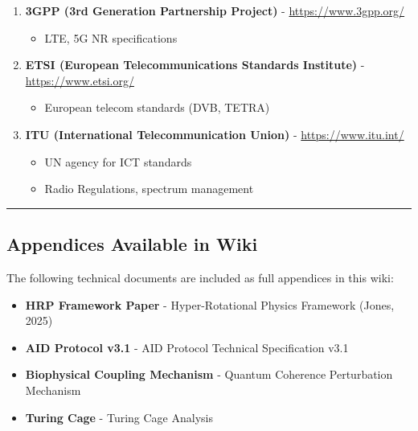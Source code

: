 \begin{enumerate}
\def\labelenumi{\arabic{enumi}.}
\setcounter{enumi}{63}
\tightlist
\item
  \textbf{3GPP (3rd Generation Partnership Project)} - \url{https://www.3gpp.org/}

  \begin{itemize}
  \tightlist
  \item
    LTE, 5G NR specifications
  \end{itemize}
\item
  \textbf{ETSI (European Telecommunications Standards Institute)} - \url{https://www.etsi.org/}

  \begin{itemize}
  \tightlist
  \item
    European telecom standards (DVB, TETRA)
  \end{itemize}
\item
  \textbf{ITU (International Telecommunication Union)} - \url{https://www.itu.int/}

  \begin{itemize}
  \tightlist
  \item
    UN agency for ICT standards
  \item
    Radio Regulations, spectrum management
  \end{itemize}
\end{enumerate}

\begin{center}\rule{0.5\linewidth}{0.5pt}\end{center}

\subsection{\texorpdfstring{Appendices Available in Wiki}{Appendices Available in Wiki}}\label{appendices-available-in-wiki}

The following technical documents are included as full appendices in
this wiki:

\begin{itemize}
\tightlist
\item
  \textbf{HRP Framework Paper} - Hyper-Rotational Physics Framework
  (Jones, 2025)
\item
  \textbf{AID Protocol v3.1} - AID Protocol Technical Specification
  v3.1
\item
  \textbf{Biophysical Coupling Mechanism} - Quantum Coherence
  Perturbation Mechanism
\item
  \textbf{Turing Cage} - Turing Cage Analysis
\end{itemize}


